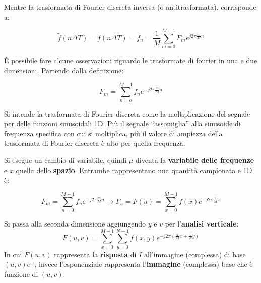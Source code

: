 \documentclass[a4paper]{article}
\newcommand{\dquotes}[1]{``#1''}
\begin{document}
	\noindent
	Mentre la trasformata di Fourier discreta inversa (o antitrasformata), corrisponde a:
	
	\begin{equation*}
		\tilde{f}\left(n \Delta T\right) = f\left(n \Delta T\right) = f_{n} = \dfrac{1}{M} \sum_{m=0}^{M-1} F_{m} e^{j 2 \pi \frac{m}{M} n}
	\end{equation*}

	\noindent
	È possibile fare alcune osservazioni riguardo le trasformate di fourier in una e due dimensioni. Partendo dalla definizione:
	
	\begin{equation*}
		F_{m} = \sum_{n=o}^{M-1} f_{n}e^{- j 2 \pi \frac{m}{M} n}
	\end{equation*}

	\noindent
	Si intende la trasformata di Fourier discreta come la moltiplicazione del segnale per delle funzioni sinusoidali 1D. Più il segnale \dquotes{assomiglia} alla sinusoide di frequenza specifica con cui si moltiplica, più il valore di ampiezza della trasformata di Fourier discreta è alto per quella frequenza.\newline
	
	\noindent
	Si esegue un cambio di variabile, quindi $\mu$ diventa la \textbf{variabile delle frequenze} e $x$ quella dello \textbf{spazio}. Entrambe rappresentano una quantità campionata e 1D è:
	
	\begin{equation*}
		F_{m} = \sum_{n=0}^{M-1} f_{n} e^{- j 2 \pi \frac{m}{M} n} \longrightarrow F_{u} = F\left(u\right) = \sum_{x=0}^{M-1} f\left(x\right) e^{- j 2 \pi \frac{u}{M} x}
	\end{equation*}

	\noindent
	Si passa alla seconda dimensione aggiungendo $y$ e $v$ per l'\textbf{analisi verticale}:	
	\begin{equation*}
		F\left(u,v\right) = \sum_{x=0}^{M-1} \sum_{y=0}^{N-1} f\left(x,y\right) e^{- j 2 \pi \left(\frac{u}{M} x + \frac{v}{N} y\right)}
	\end{equation*}
	In cui $F\left(u,v\right)$ rappresenta la \textbf{risposta} di $I$ all'immagine (complessa) di base $\left(u,v\right) e^{\cdots}$, invece l'esponenziale rappresenta l'\textbf{immagine} (complessa) base che è funzione di $\left(u,v\right)$.\newpage
	
\end{document}
